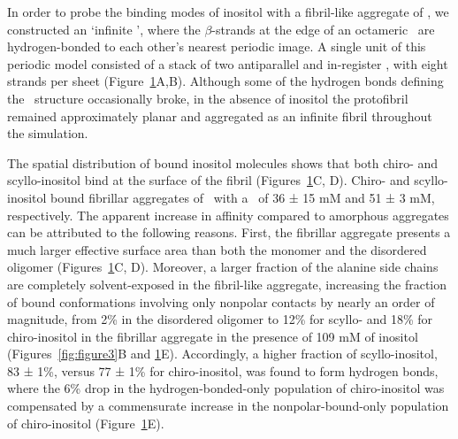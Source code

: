 \begin{figure}[htbp]
   \label{fig:figure6}
\end{figure}

In order to probe the binding modes of inositol with a fibril-like aggregate of \gafour, we constructed an ‘infinite \bsheet’, where the $\beta$-strands at the edge of an octameric \bsheet\ are hydrogen-bonded to each other’s nearest periodic image. A single unit of this periodic model consisted of a stack of two antiparallel and in-register \bsheets, with eight strands per sheet (Figure~\ref{fig:figure6}A,B). Although some of the hydrogen bonds defining the \bsheet\ structure occasionally broke, in the absence of inositol the protofibril remained approximately planar and aggregated as an infinite fibril throughout the simulation.

The spatial distribution of bound inositol molecules shows that both chiro- and scyllo-inositol bind at the surface of the fibril (Figures~\ref{fig:figure6}C, D). Chiro- and scyllo-inositol bound fibrillar aggregates of \gafour\ with a \KD\ of 36 ± 15 mM and 51 ± 3 mM, respectively. The apparent increase in affinity compared to amorphous aggregates can be attributed to the following reasons. First, the fibrillar aggregate presents a much larger effective surface area than both the monomer and the disordered oligomer (Figures~\ref{fig:figure6}C, D). Moreover, a larger fraction of the alanine side chains are completely solvent-exposed in the fibril-like aggregate, increasing the fraction of bound conformations involving only nonpolar contacts by nearly an order of magnitude, from 2\% in the disordered oligomer to 12\% for scyllo- and 18\% for chiro-inositol in the fibrillar aggregate in the presence of 109 mM of inositol (Figures~\ref{fig:figure3}B and \ref{fig:figure6}E). Accordingly, a higher fraction of scyllo-inositol, 83 ± 1\%, versus 77 ± 1\% for chiro-inositol, was found to form hydrogen bonds, where the 6\% drop in the hydrogen-bonded-only population of chiro-inositol was compensated by a commensurate increase in the nonpolar-bound-only population of chiro-inositol (Figure~\ref{fig:figure6}E).

